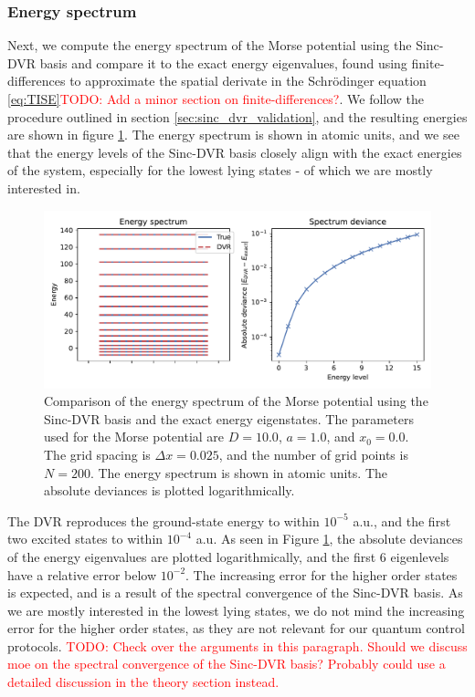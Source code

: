 \documentclass{subfiles}
\begin{document}
\subsubsection*{Energy spectrum}
Next, we compute the energy spectrum of the Morse potential using the Sinc-DVR basis and compare it to the exact energy eigenvalues, found using finite-differences to approximate the spatial derivate in the Schrödinger equation \eqref{eq:TISE}\textcolor{red}{TODO: Add a minor section on finite-differences?}. We follow the procedure outlined in section \ref{sec:sinc_dvr_validation}, and the resulting energies are shown in figure \ref{fig:dvr_validation}. The energy spectrum is shown in atomic units, and we see that the energy levels of the Sinc-DVR basis closely align with the exact energies of the system, especially for the lowest lying states - of which we are mostly interested in. 
\begin{figure}[h!]
    \centering
    \includegraphics[width=\textwidth]{figs/dvr_validation.pdf}
    \caption{Comparison of the energy spectrum of the Morse potential using the Sinc-DVR basis and the exact energy eigenstates. The parameters used for the Morse potential are $D = 10.0$, $a = 1.0$, and $x_0 = 0.0$. The grid spacing is $\Delta x = 0.025$, and the number of grid points is $N = 200$. The energy spectrum is shown in atomic units. The absolute deviances is plotted logarithmically.}
    \label{fig:dvr_validation}
\end{figure}

The DVR reproduces the ground-state energy to within $10^{-5}$ a.u., and the first two excited states to within $10^{-4}$ a.u. As seen in Figure \ref{fig:dvr_validation}, the absolute deviances of the energy eigenvalues are plotted logarithmically, and the first 6 eigenlevels have a relative error below $10^{-2}$. The increasing error for the higher order states is expected, and is a result of the spectral convergence of the Sinc-DVR basis. As we are mostly interested in the lowest lying states, we do not mind the increasing error for the higher order states, as they are not relevant for our quantum control protocols. \textcolor{red}{TODO: Check over the arguments in this paragraph. Should we discuss moe on the spectral convergence of the Sinc-DVR basis? Probably could use a detailed discussion in the theory section instead.}
\end{document}
